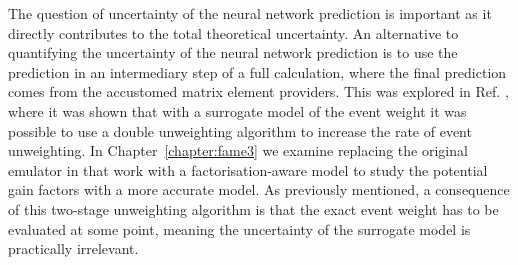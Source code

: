 \documentclass[main.tex]{subfiles}
\begin{document}
    The question of uncertainty of the neural network
    prediction is important as it directly contributes to the total
    theoretical uncertainty. An alternative to quantifying
    the uncertainty of the neural network prediction is to
    use the prediction in an intermediary step of a full
    calculation, where the final prediction comes from the
    accustomed matrix element providers. This was explored in
    Ref. \cite{Danziger:2021eeg},
    where it was shown that with a surrogate model of the event
    weight it was possible to use a double unweighting
    algorithm to increase the rate of event unweighting.
    In Chapter~\ref{chapter:fame3} we examine replacing
    the original emulator in that work with a factorisation-aware
    model to study the potential gain factors with a more
    accurate model. As previously mentioned, a consequence of
    this two-stage unweighting
    algorithm is that the exact event weight has to be evaluated
    at some point, meaning the uncertainty of the surrogate
    model is practically irrelevant.
\end{document}
